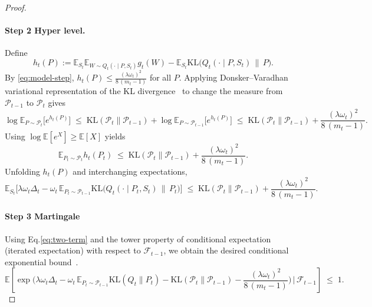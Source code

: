 \documentclass[10pt]{article} %
\begin{document}
\begin{proof}
\paragraph{Step 2 Hyper level.} 
Define
\[
h_t(P):=\mathbb E_{S_t}\mathbb E_{W\sim Q_t(\cdot\mid P,S_t)} g_t(W)
-\mathbb E_{S_t}\mathrm{KL}\!\big(Q_t(\cdot\mid P,S_t)\,\|\,P\big).
\]
By \eqref{eq:model-step}, $h_t(P)\le \frac{(\lambda\omega_t)^2}{8\,(m_t-1)}$ for all $P$.
Applying Donsker–Varadhan variational representation of the KL divergence~\cite{NEURIPS2021_54a367d6} to change the measure from $\mathcal P_{t-1}$ to $\mathcal P_t$ gives
\begin{equation}
\label{eq:dv-p}
\log\mathbb E_{P\sim\mathcal P_t}\!\big[e^{h_t(P)}\big]
\;\le\; \mathrm{KL}(\mathcal P_t\|\mathcal P_{t-1})
+\log\mathbb E_{P\sim\mathcal P_{t-1}}\!\big[e^{h_t(P)}\big]
\;\le\; \mathrm{KL}(\mathcal P_t\|\mathcal P_{t-1})
+\frac{(\lambda\omega_t)^2}{8\,(m_t-1)}.
\end{equation}
Using $\log\mathbb E[e^X]\ge \mathbb E[X]$ yields
\begin{equation}
\label{eq:p-expect}
\mathbb E_{P_t\sim\mathcal P_t} h_t(P_t)
\;\le\; \mathrm{KL}(\mathcal P_t\|\mathcal P_{t-1})
+\frac{(\lambda\omega_t)^2}{8\,(m_t-1)}.
\end{equation}
Unfolding $h_t(P)$ and interchanging expectations,
\begin{equation}
\label{eq:two-term}
\mathbb E_{S_t}\Big[
\lambda\omega_t\Delta_t
-\omega_t\,\mathbb E_{P_t\sim\mathcal P_{t-1}}\mathrm{KL}\!\big(Q_t(\cdot\mid P_t,S_t)\,\|\,P_t\big)
\Big]
\;\le\;
\mathrm{KL}(\mathcal P_t\|\mathcal P_{t-1})
+\frac{(\lambda\omega_t)^2}{8\,(m_t-1)}.
\end{equation}

\paragraph{Step 3 Martingale}







Using Eq.\eqref{eq:two-term} and the tower property of conditional expectation (iterated expectation) with respect to $\mathcal F_{t-1}$, we obtain the desired conditional exponential bound~\cite{yangshuxue}.
\begin{equation}
\label{eq:cond-mgf}
\mathbb E\!\left[
\exp\!\Big(
\lambda\omega_t\Delta_t
-\omega_t\,\mathbb E_{P_t\sim\mathcal P_{t-1}}\mathrm{KL}(Q_t\|P_t)
-\mathrm{KL}(\mathcal P_t\|\mathcal P_{t-1})
-\frac{(\lambda\omega_t)^2}{8\,(m_t-1)}
\Big)\,\Big|\,\mathcal F_{t-1}\right]\;\le\;1.
\end{equation}



\end{proof}
\end{document}
